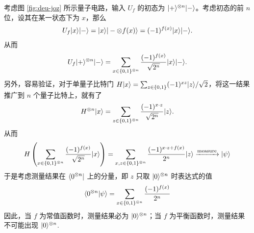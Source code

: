 考虑图 \ref{fig:deu-joz} 所示量子电路，输入 $U_f$ 的初态为 $|+\rangle^{\otimes n}|-\rangle$。考虑初态的前 $n$ 位，设其在某一状态下为 $x$，那么 \begin{align*}
    U_f|x\rangle|-\rangle=|x\rangle|-\otimes f(x)\rangle=(-1)^{f(x)}|x\rangle|-\rangle.
\end{align*}
从而 \begin{align*}
    U_f|+\rangle^{\otimes n}|-\rangle=\sum_{x\in\{0,1\}^{\otimes n}}\frac{(-1)^{f(x)}}{\sqrt{2^n}}|x\rangle|-\rangle.
\end{align*}
另外，容易验证，对于单量子比特门 $H|x\rangle=\sum_{z\in\{0,1\}}(-1)^{xz}|z\rangle/\sqrt{2}$，将这一结果推广到 $n$ 个量子比特上，就有了 \begin{align*}
    H^{\otimes n}|x\rangle=\sum_{z\in\{0,1\}^{\otimes n}}\frac{(-1)^{x\cdot z}}{\sqrt{2^n}}|z\rangle.
\end{align*}
从而 \begin{align*}
    H\left(\sum_{x\in\{0,1\}^{\otimes n}}\frac{(-1)^{f(x)}}{\sqrt{2^n}}|x\rangle\right)=\sum_{x,z\in\{0,1\}^{\otimes n}}\frac{(-1)^{x\cdot z+f(x)}}{2^n}|z\rangle\xrightarrow{\text{measure}}|\psi\rangle
\end{align*}
于是考虑测量结果在 $\langle0^{\otimes n}|$ 上的分量，即 $z$ 只取 $|0\rangle^{\otimes n}$ 时表达式的值 \begin{align*}
    \langle0^{\otimes n}|\psi\rangle=\sum_{x\in\{0,1\}^{\otimes n}}\frac{(-1)^{f(x)}}{2^n}
\end{align*}
因此，当 $f$ 为常值函数时，测量结果必为 $|0\rangle^{\otimes n}$；当 $f$ 为平衡函数时，测量结果不可能出现 $|0\rangle^{\otimes n}$.